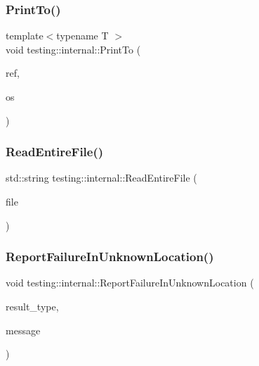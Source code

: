 \mbox{\label{namespacetesting_1_1internal_a8fd10cc30084c36a89c74868c8bd53f8}} 
\subsubsection{\texorpdfstring{Print\+To()}{PrintTo()}\hspace{0.1cm}{\footnotesize\ttfamily [20/20]}}
{\footnotesize\ttfamily template$<$typename T $>$ \\
void testing\+::internal\+::\+Print\+To (\begin{DoxyParamCaption}\item[{const \hyperlink{classtesting_1_1internal_1_1_reference_wrapper}{Reference\+Wrapper}$<$ T $>$ \&}]{ref,  }\item[{\+::std\+::ostream $\ast$}]{os }\end{DoxyParamCaption})}

\mbox{\label{namespacetesting_1_1internal_a2cc0be60c54a8701423fe5297e1349ee}} 
\subsubsection{\texorpdfstring{Read\+Entire\+File()}{ReadEntireFile()}}
{\footnotesize\ttfamily std\+::string testing\+::internal\+::\+Read\+Entire\+File (\begin{DoxyParamCaption}\item[{F\+I\+LE $\ast$}]{file }\end{DoxyParamCaption})}

\mbox{\label{namespacetesting_1_1internal_a85f6ff0e40f9a5f10af66a73cf1364fa}} 
\subsubsection{\texorpdfstring{Report\+Failure\+In\+Unknown\+Location()}{ReportFailureInUnknownLocation()}}
{\footnotesize\ttfamily void testing\+::internal\+::\+Report\+Failure\+In\+Unknown\+Location (\begin{DoxyParamCaption}\item[{\hyperlink{classtesting_1_1_test_part_result_a65ae656b33fdfdfffaf34858778a52d5}{Test\+Part\+Result\+::\+Type}}]{result\+\_\+type,  }\item[{const std\+::string \&}]{message }\end{DoxyParamCaption})}

